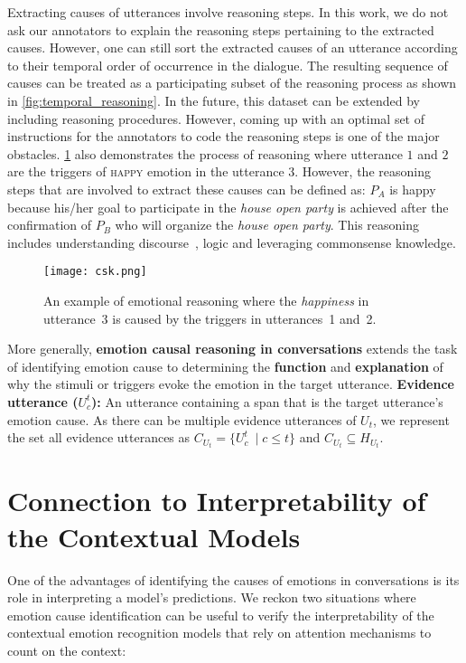 \documentclass[smallextended]{svjour3}
\newcommand\emo[1]{\textsc{#1}}
\newcommand\0{\hphantom{0}}
\begin{document}
Extracting causes of utterances involve reasoning steps. In this work, we do not ask our annotators to explain the reasoning steps pertaining to the extracted causes. However, one can still sort the extracted causes of an utterance according to their temporal order of occurrence in the dialogue. The resulting sequence of causes can be treated as a participating subset of the reasoning process as shown in \cref{fig:temporal_reasoning}. In the future, this dataset can be extended by including reasoning procedures. However, coming up with an optimal set of instructions for the annotators to code the reasoning steps is one of the major obstacles. \cref{fig:csk_exx} also demonstrates the process of reasoning where utterance $1$ and $2$ are the triggers of \emo{happy} emotion in the utterance $3$. However, the reasoning steps that are involved to extract these causes can be defined as: $P_A$ is happy because his/her goal to participate in the \textit{house open party} is achieved after the confirmation of $P_B$ who will organize the \textit{house open party}. This reasoning includes understanding discourse~\cite{chakrabarty-etal-2019-ampersand}, logic and leveraging commonsense knowledge.
\begin{figure}[ht!]
    \centering
    \texttt{[image: csk.png]}
    \caption{{An example of emotional reasoning where the \emph{happiness} in utterance~3 is caused by the triggers in utterances~1 and~2.}}
    \label{fig:csk_exx}
\end{figure}

More generally, 
\textbf{emotion causal reasoning in conversations}
extends the task of identifying emotion cause to determining the \textbf{function} and \textbf{explanation} of why the stimuli or triggers evoke the emotion in the target utterance. 
\textbf{Evidence utterance ($U^t_c$):} An utterance containing a span that is the target utterance's emotion cause. As there can be multiple evidence utterances of $U_t$, we represent the set all evidence utterances as $C_{U_t} = \{U^t_c\ \mid c \leq t\}$ and $C_{U_t} \subseteq H_{U_t}$. 












\section{Connection to Interpretability of the Contextual Models}
One of the advantages of identifying the causes of emotions in conversations is its role in interpreting a model's predictions. We reckon two situations where emotion cause identification can be useful to verify the interpretability of the contextual emotion recognition models that rely on attention mechanisms to count on the context:
\end{document}
